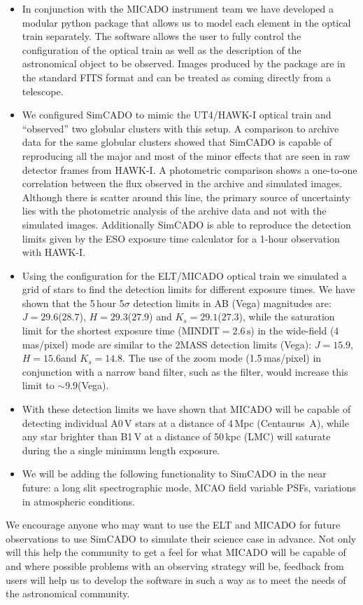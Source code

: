 \begin{itemize}

    \item In conjunction with the MICADO instrument team we have developed a modular python package that allows us to model each element in the optical train separately. The software allows the user to fully control the configuration of the optical train as well as the description of the astronomical object to be observed. Images produced by the package are in the standard FITS format and can be treated as coming directly from a telescope.
    
    \item We configured SimCADO to mimic the UT4/HAWK-I optical train and ``observed'' two globular clusters with this setup. A comparison to archive data for the same globular clusters showed that SimCADO is capable of reproducing all the major and most of the minor effects that are seen in raw detector frames from HAWK-I. A photometric comparison shows a one-to-one correlation between the flux observed in the archive and simulated images. Although there is scatter around this line, the primary source of uncertainty lies with the photometric analysis of the archive data and not with the simulated images. Additionally SimCADO is able to reproduce the detection limits given by the ESO exposure time calculator for a 1-hour observation with HAWK-I.
    
    \item Using the configuration for the ELT/MICADO optical train we simulated a grid of stars to find the detection limits for different exposure times. We have shown that the 5\,hour 5$\sigma$ detection limits in AB (Vega) magnitudes are: $J=29.6$\m ($28.7$\m), $H=29.3$\m ($27.9$\m) and $K_{s}=29.1$\m ($27.3$\m), while the saturation limit for the shortest exposure time ($\mathrm{MINDIT}=2.6\,\mathrm{s}$) in the wide-field (4\,mas/pixel) mode are similar to the 2MASS detection limits (Vega): $J=15.9$\m, $H=15.6$\m and $K_{s}=14.8$\m. The use of the zoom mode (1.5\,mas/pixel) in conjunction with a narrow band filter, such as the \brgamma filter, would increase this limit to $\sim 9.9$\m (Vega).

    \item With these detection limits we have shown that MICADO will be capable of detecting individual A0\,V stars at a distance of 4\,Mpc (Centaurus~A), while any star brighter than B1\,V at a distance of 50\,kpc (LMC) will saturate during the a single minimum length exposure.
    
    \item We will be adding the following functionality to SimCADO in the near future: a long slit spectrographic mode, MCAO field variable PSFs, variations in atmospheric conditions.

\end{itemize}

We encourage anyone who may want to use the ELT and MICADO for future observations to use SimCADO to simulate their science case in advance. Not only will this help the community to get a feel for what MICADO will be capable of and where possible problems with an observing strategy will be, feedback from users will help us to develop the software in such a way as to meet the needs of the astronomical community.